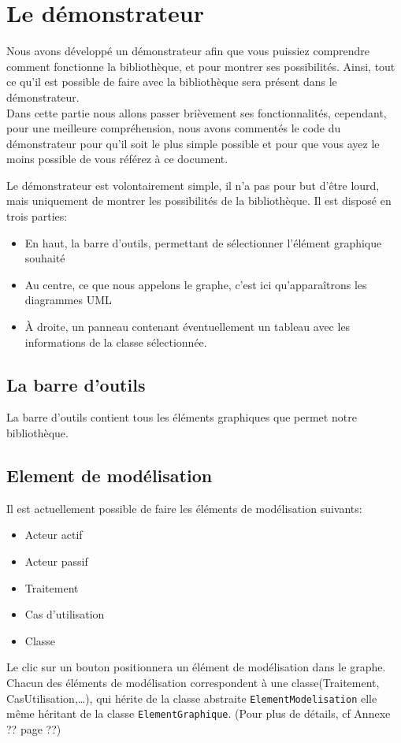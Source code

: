 \documentclass[12pt,a4paper,openany]{book}
\begin{document}
	\maketitle
	\setcounter{tocdepth}{3}
	\setcounter{secnumdepth}{3}
	\frontmatter
	
	\mainmatter
	\tableofcontents
	\newpage
	\chapter{Le démonstrateur}
	Nous avons développé un démonstrateur afin que vous puissiez comprendre comment fonctionne la bibliothèque, et pour montrer ses possibilités.
	Ainsi, tout ce qu'il est possible de faire avec la bibliothèque sera présent dans le démonstrateur.\\
	Dans cette partie nous allons passer brièvement ses fonctionnalités, cependant, pour une meilleure
	compréhension, nous avons commentés le code du démonstrateur pour qu'il soit le plus simple possible et pour que vous ayez le moins 
	possible de vous référez à ce document. 
	
	Le démonstrateur est volontairement simple, il n'a pas pour but d'être lourd, mais uniquement de montrer les possibilités de la bibliothèque. 
	Il est disposé en trois parties:
	\begin{itemize}
		\item En haut, la barre d'outils, permettant de sélectionner l'élément graphique souhaité
		\item Au centre, ce que nous appelons le graphe, c'est ici qu'apparaîtrons les diagrammes UML
		\item À droite, un panneau contenant éventuellement un tableau avec les informations de la classe sélectionnée.
	\end{itemize}
	\section{La barre d'outils}
	La barre d'outils contient tous les éléments graphiques que permet notre bibliothèque.
	\section{Element de modélisation}
	Il est actuellement possible de faire les éléments de modélisation suivants:
	\begin{itemize}
		\item Acteur actif
		\item Acteur passif
		\item Traitement
		\item Cas d'utilisation
		\item Classe
	\end{itemize}
	Le clic sur un bouton positionnera un élément de modélisation dans le graphe.\\
	Chacun des éléments de modélisation correspondent à une classe(Traitement, CasUtilisation,\ldots), qui hérite de la classe abstraite \texttt{ElementModelisation} 
	elle même héritant de la classe \texttt{ElementGraphique}. (Pour plus de détails, cf Annexe ?? page ??)%
\end{document}
